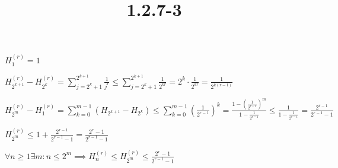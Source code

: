 \documentclass{article}
\title{1.2.7-3}
\begin{document}
\maketitle

$H_1^{(r)} = 1$

$H_{2^{k+1}}^{(r)} - H_{2^{k}}^{(r)} = \sum_{j=2^{k}+1}^{2^{k+1}} \frac{1}{j^r} \leq \sum_{j=2^{k}+1}^{2^{k+1}} \frac{1}{2^{kr}} = 2^{k} \cdot \frac{1}{2^{kr}} = \frac{1}{2^{k(r-1)}}$

$H_{2^m}^{(r)} - H_1^{(r)} = \sum_{k=0}^{m-1} (H_{2^{k+1}}-H_{2^{k}}) \leq \sum_{k=0}^{m-1}(\frac{1}{2^{r-1}})^k = \frac{1-(\frac{1}{2^{r-1}})^m}{1 - \frac{1}{2^{r-1}}} \leq \frac{1}{1 - \frac{1}{2^{r-1}}} = \frac{2^{r-1}}{2^{r-1} - 1}$

$H_{2^m}^{(r)} \leq 1 + \frac{2^{r-1}}{2^{r-1} - 1} = \frac{2^r - 1}{2^{r-1} - 1}$

$\forall n \geq 1 \exists m: n \leq 2^m \implies H_n^{(r)} \leq H_{2^m}^{(r)} \leq \frac{2^{r}-1}{2^{r-1} - 1}$
\end{document}
